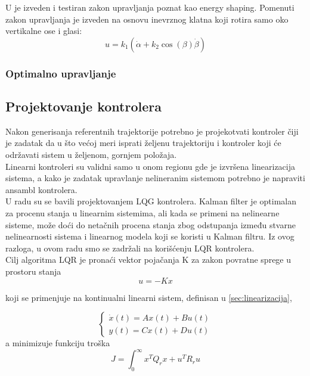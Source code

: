 \documentclass[a4paper,11pt]{article}
\theoremstyle{definition} \newtheorem{deff}{Definicija}[section]
\theoremstyle{definition} \newtheorem{prim}[deff]{Primer}
\theoremstyle{plain} \newtheorem{teor}[deff]{Teorema}
\begin{document}
	U \cite{ener_shaping} je izveden i testiran zakon upravljanja poznat kao energy shaping. Pomenuti zakon upravljanja je izveden na osnovu inevrznog klatna koji rotira samo oko vertikalne ose i glasi: \\
	
	\begin{equation}
		u = k_1 (\dot\alpha + k_2 \cos(\beta) \dot\beta)	
	\end{equation}
	
	\subsubsection{Optimalno upravljanje}
	
	\newpage
	\subsection{Projektovanje kontrolera}
	
	Nakon generisanja referentnih trajektorije potrebno je projekotvati kontroler čiji je zadatak da u što većoj meri isprati željenu trajektoriju i kontroler koji će održavati sistem u željenom, gornjem položaja. \\
	
	Linearni kontroleri su validni samo u onom regionu gde je izvršena linearizacija sistema, a kako je zadatak upravlanje nelineranim sistemom potrebno je napraviti ansambl kontrolera. \\
	
	U radu \cite{inicijalna} su se bavili projektovanjem LQG kontrolera. Kalman filter je optimalan za procenu stanja u linearnim sistemima, ali kada se primeni na nelinearne sisteme, može doći do netačnih procena stanja zbog odstupanja između stvarne nelinearnosti sistema i linearnog modela koji se koristi u Kalman filtru. Iz ovog razloga, u ovom radu smo se zadržali na korišćenju LQR kontrolera. \\
	
	Cilj algoritma LQR je pronaći vektor pojačanja K za zakon povratne sprege u prostoru stanja
	\begin{equation}
		u = -Kx 
	\end{equation}
	
	koji se primenjuje na kontinualni linearni sistem, definisan u \ref{sec:linearizacija},
	
	\begin{equation}
		\begin{cases}
			\dot{x}(t) = Ax(t) + Bu(t) \\
			y(t) = Cx(t) + Du(t)
		\end{cases}
	\end{equation}
	a minimizuje funkciju troška
	\begin{equation}
		J = \int_{0}^{\infty}  x^T Q_r x  + u^T R_r u
	\end{equation}
	
\end{document}
